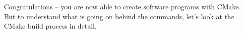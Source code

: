 Congratulations – you are now able to create software programs with CMake. But to understand what is going on behind the commands, let's look at the CMake build process in detail.































